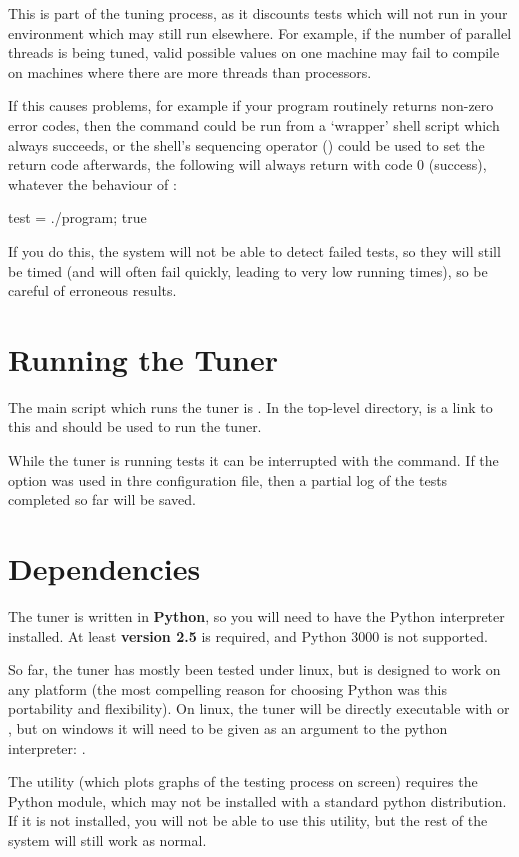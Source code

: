 \documentclass[a4paper, draft]{article}
\begin{document}
This is part of the tuning process, 
as it discounts tests which will not run in your environment which may still 
run elsewhere. For example, if the number of parallel threads is being tuned, 
valid possible values on one machine may fail to compile on machines where 
there are more threads than processors. 

If this causes problems, for example 
if your program routinely returns non-zero error codes, then the 
 command could be run from a `wrapper' shell script which 
always succeeds, or the shell's sequencing operator (\command{;}) could be 
used to set the return code afterwards, the following will always return 
with code 0 (success), whatever the behaviour of :
\begin{Code}[numbers=none]
test = ./program; true
\end{Code}

If you do this, the system will not be able to detect failed tests, so they 
will still be timed (and will often fail quickly, leading to very low running 
times), so be careful of erroneous results.






\section{Running the Tuner}
The main script which runs the tuner is . In the 
top-level directory,  is a link to this and should be used 
to run the tuner.

While the tuner is running tests it can be interrupted with the 
 command. If the  option was used in thre 
configuration file, then a partial log of the tests completed so far will 
be saved.



\section{Dependencies}
The tuner is written in \textbf{Python}, so you will need to have the Python 
interpreter installed. At least \textbf{version 2.5} is required, and 
Python 3000 is not supported.

So far, the tuner has mostly been tested under linux, but is
designed to work on any platform (the most compelling reason for choosing 
Python was this portability and flexibility). On linux, the 
tuner will be directly executable with  or 
, but on windows it will need to be given as an 
argument to the python interpreter: 
.

The utility  (which plots graphs of the testing 
process on screen) requires the  
Python module, which may not be installed with a standard python 
distribution. If it is not installed, you will not be able to use this 
utility, but the rest of the system will still work as normal.
\end{document}
